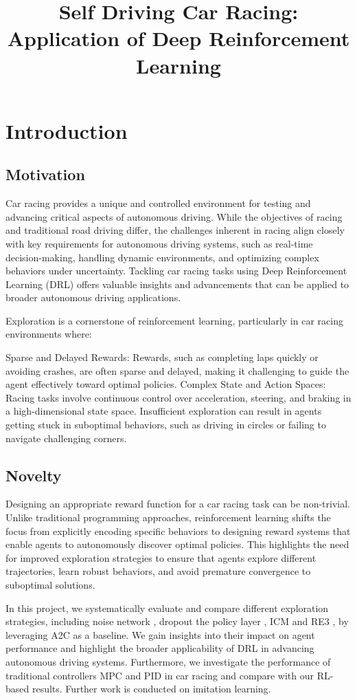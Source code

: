 \documentclass{article}
\title{Self Driving Car Racing: Application of Deep Reinforcement Learning}
\author{}
\begin{document}
\section{Introduction}
\subsection{Motivation}
Car racing provides a unique and controlled environment for testing and advancing critical aspects of autonomous driving. While the objectives of racing and traditional road driving differ, the challenges inherent in racing align closely with key requirements for autonomous driving systems, such as real-time decision-making, handling dynamic environments, and optimizing complex behaviors under uncertainty. Tackling car racing tasks using Deep Reinforcement Learning (DRL) offers valuable insights and advancements that can be applied to broader autonomous driving applications.

Exploration is a cornerstone of reinforcement learning, particularly in car racing environments where:

Sparse and Delayed Rewards: Rewards, such as completing laps quickly or avoiding crashes, are often sparse and delayed, making it challenging to guide the agent effectively toward optimal policies.
Complex State and Action Spaces: Racing tasks involve continuous control over acceleration, steering, and braking in a high-dimensional state space. Insufficient exploration can result in agents getting stuck in suboptimal behaviors, such as driving in circles or failing to navigate challenging corners.

\subsection{Novelty}
Designing an appropriate reward function for a car racing task can be non-trivial. Unlike traditional programming approaches, reinforcement learning shifts the focus from explicitly encoding specific behaviors to designing reward systems that enable agents to autonomously discover optimal policies. This highlights the need for improved exploration strategies to ensure that agents explore different trajectories, learn robust behaviors, and avoid premature convergence to suboptimal solutions.

In this project, we systematically evaluate and compare different exploration strategies, including noise network \cite{NoisyNet}, dropout the policy layer \cite{DP}, ICM \cite{ICM} and RE3 \cite{RE3}, by leveraging A2C as a baseline. We gain insights into their impact on agent performance and highlight the broader applicability of DRL in advancing autonomous driving systems. Furthermore, we investigate the performance of traditional controllers MPC and PID in car racing and compare with our RL-based results. Further work is conducted on imitation learning.
\end{document}
